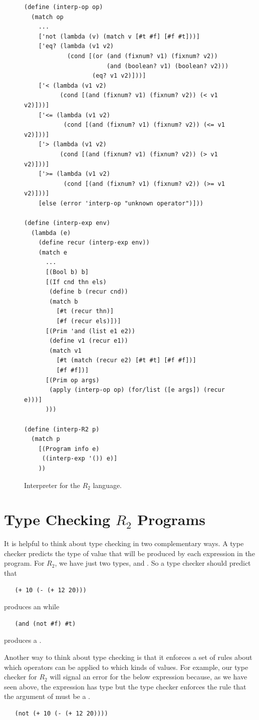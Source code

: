 \documentclass[11pt]{book}
\begin{document}
\begin{figure}[tbp]
\begin{lstlisting}
(define (interp-op op)
  (match op
    ...
    ['not (lambda (v) (match v [#t #f] [#f #t]))]
    ['eq? (lambda (v1 v2)
            (cond [(or (and (fixnum? v1) (fixnum? v2))
                       (and (boolean? v1) (boolean? v2)))
                   (eq? v1 v2)]))]
    ['< (lambda (v1 v2)
          (cond [(and (fixnum? v1) (fixnum? v2)) (< v1 v2)]))]
    ['<= (lambda (v1 v2)
           (cond [(and (fixnum? v1) (fixnum? v2)) (<= v1 v2)]))]
    ['> (lambda (v1 v2)
          (cond [(and (fixnum? v1) (fixnum? v2)) (> v1 v2)]))]
    ['>= (lambda (v1 v2)
           (cond [(and (fixnum? v1) (fixnum? v2)) (>= v1 v2)]))]
    [else (error 'interp-op "unknown operator")]))

(define (interp-exp env)
  (lambda (e)
    (define recur (interp-exp env))
    (match e
      ...
      [(Bool b) b]
      [(If cnd thn els)
       (define b (recur cnd))
       (match b
         [#t (recur thn)]
         [#f (recur els)])]
      [(Prim 'and (list e1 e2))
       (define v1 (recur e1))
       (match v1
         [#t (match (recur e2) [#t #t] [#f #f])]
         [#f #f])]
      [(Prim op args)
       (apply (interp-op op) (for/list ([e args]) (recur e)))]
      )))

(define (interp-R2 p)
  (match p
    [(Program info e)
     ((interp-exp '()) e)]
    ))
\end{lstlisting}
\caption{Interpreter for the $R_2$ language.}
\label{fig:interp-R2}
\end{figure}


\section{Type Checking $R_2$ Programs}
\label{sec:type-check-r2}

It is helpful to think about type checking in two complementary
ways. A type checker predicts the type of value that will be produced
by each expression in the program.  For $R_2$, we have just two types,
 and . So a type checker should predict that
\begin{lstlisting}
   (+ 10 (- (+ 12 20)))
\end{lstlisting}
produces an  while
\begin{lstlisting}
   (and (not #f) #t)
\end{lstlisting}
produces a .

Another way to think about type checking is that it enforces a set of
rules about which operators can be applied to which kinds of
values. For example, our type checker for $R_2$ will signal an error
for the below expression because, as we have seen above, the
expression  has type  but the type
checker enforces the rule that the argument of  must be a
.
\begin{lstlisting}
   (not (+ 10 (- (+ 12 20))))
\end{lstlisting}
\end{document}
